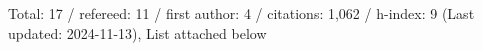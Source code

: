 Total: 17 / refereed: 11 / first author: 4 / citations: 1,062 / h-index: 9 (Last updated: 2024-11-13), List attached below
